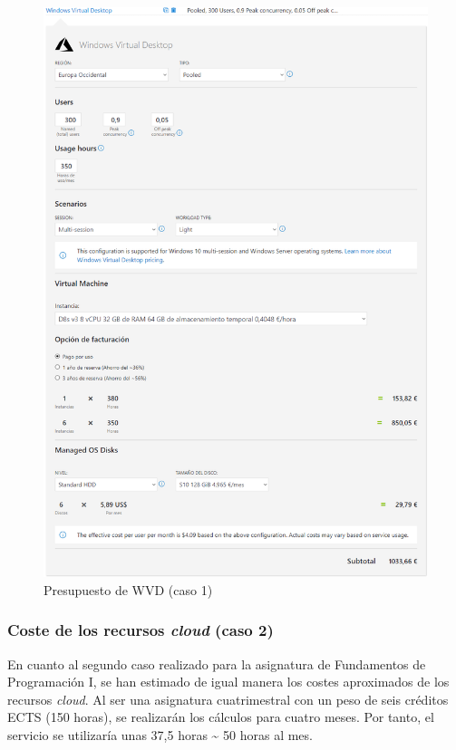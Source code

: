 \begin{figure}[h]
  \centering
  \includegraphics[width=0.9\linewidth]{figures/images/presupuesto/presu_wvd.png}
  \caption{Presupuesto de \acs{WVD} (caso 1)}
  \label{fig:presu_WVD}
\end{figure}

\clearpage

\subsubsection{Coste de los recursos \textit{cloud} (caso 2)}
En cuanto al segundo caso realizado para la asignatura de Fundamentos de Programación I, se han estimado de igual manera los costes aproximados de los recursos \textit{cloud}. Al ser una asignatura cuatrimestral con un peso de seis créditos \acs{ECTS} (150 horas), se realizarán los cálculos para cuatro meses. Por tanto, el servicio se utilizaría unas 37,5 horas \textasciitilde{} 50 horas al mes.


